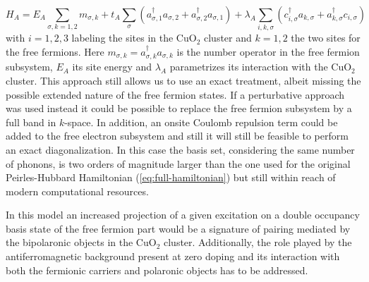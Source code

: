 \begin{equation}
  \label{eq:multicomponent}
  H_A = 
  E_A \sum_{\sigma, k=1,2} m_{\sigma, k} + 
  t_A \sum_{\sigma} (a_{\sigma, 1}^\dagger a_{\sigma, 2} + a_{\sigma,2}^\dagger a_{\sigma, 1}) + 
  \lambda_A \sum_{i,k,\sigma} \left( c_{i,\sigma}^\dagger a_{k,\sigma} + a_{k,\sigma}^\dagger c_{i,\sigma} \right) 
\end{equation}
% 
with $i=1,2,3$ labeling the sites in the CuO$_2$ cluster and $k=1,2$ the two sites for the free fermions. 
Here $m_{\sigma, k} = a_{\sigma, k}^\dagger a_{\sigma, k}$ is the number operator in the free fermion subsystem, $E_A$ its site energy and $\lambda_A$ parametrizes its interaction with the CuO$_2$ cluster.
This approach still allows us to use an exact treatment, albeit missing the possible extended nature of the free fermion states. 
If a perturbative approach was used instead it could be possible to replace the free fermion subsystem by a full band in $k$-space. 
In addition, an onsite Coulomb repulsion term could be added to the free electron subsystem and still it will still be feasible to perform an exact diagonalization. 
In this case the basis set, considering the same number of phonons, is two orders of magnitude larger than the one used for the original Peirles-Hubbard Hamiltonian (\ref{eq:full-hamiltonian}) but still within reach of modern computational resources.
 
In this model an increased projection of a given excitation on a double occupancy basis state of the free fermion part would be a signature of pairing mediated by the bipolaronic objects in the CuO$_2$ cluster. 
Additionally, the role played by the antiferromagnetic background present at zero doping and its interaction with both the fermionic carriers and polaronic objects has to be addressed.
